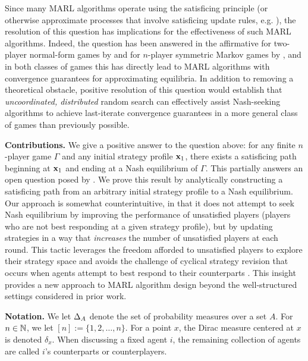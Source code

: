 Since many MARL algorithms operate using the satisficing principle (or otherwise approximate processes that involve satisficing update rules, e.g. \cite{swenson2018distributed}), the resolution of this question has implications for the effectiveness of such MARL algorithms. Indeed, the question has been answered in the affirmative for two-player normal-form games by \cite{foster2006regret} and for $n$-player symmetric Markov games by \cite{yongacoglu2023satisficing}, and in both classes of games this has directly lead to MARL algorithms with convergence guarantees for approximating equilibria. In addition to removing a theoretical obstacle, positive resolution of this question would establish that \textit{uncoordinated, distributed} random search can effectively assist Nash-seeking algorithms to achieve last-iterate convergence guarantees in a more general class of games than previously possible.

\noindent \textbf{Contributions.} We give a positive answer to the question above: for any finite $n$-player game $\Gamma$ and any initial strategy profile ${\mathbf{x}}_1$, there exists a satisficing path beginning at ${\mathbf{x}}_1$ and ending at a Nash equilibrium of $\Gamma$. This partially answers an open question posed by \cite{yongacoglu2023satisficing}. We prove this result by analytically constructing a satisficing path from an arbitrary initial strategy profile to a Nash equilibrium. Our approach is somewhat counterintuitive, in that it does not attempt to seek Nash equilibrium by improving the performance of unsatisfied players (players who are not best responding at a given strategy profile), but by updating strategies in  a way that \emph{increases} the number of unsatisfied players at each round. This tactic leverages the freedom afforded to unsatisfied players to explore their strategy space and avoids the challenge of cyclical strategy revision that occurs when agents attempt to best respond to their counterparts \cite{mertikopoulos2018cycles}. This insight provides a new approach to MARL algorithm design beyond the well-structured settings considered in prior work.

\noindent \textbf{Notation.} %
We let $\Delta_A$ denote the set of probability measures over a set $A$. %
For $n\in \mathbb{N}$, we let $[n] := \{ 1, 2, \dots, n \}$. For a point $x$, the Dirac measure centered at $x$ is denoted $\delta_x$. %
When discussing a fixed agent $i$, the remaining collection of agents are called $i$'s counterparts or counterplayers.